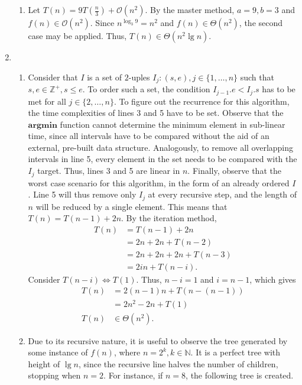 \documentclass[12pt]{article}
\begin{document}
\begin{enumerate}
\begin{enumerate}
    \item Let $T(n) = 9T(\frac{n}{3}) + \mathcal{O}(n^{2})$. By the master method, $a = 9, b = 3$ and $f(n) \in \mathcal{O}(n^{2})$. Since $n^{\log_{3} 9} = n^{2}$ and $f(n) \in \Theta(n^{2})$, the second case may be applied. Thus, $T(n) \in \Theta(n^{2} \lg n)$.
  \end{enumerate}
  \item
  \begin{enumerate}
    \item Consider that $I$ is a set of $2$-uples $I_{j} : (s, e), j \in \{1, \dots, n\}$ such that $s, e \in \mathbb{Z}^{+}, s \leq e$. To order such a set, the condition $I_{j - 1}.e < I_{j}.s$ has to be met for all $j \in \{2, \dots, n\}$. To figure out the recurrence for this algorithm, the time complexities of lines 3 and 5 have to be set. Observe that the $\textbf{argmin}$ function cannot determine the minimum element in sub-linear time, since all intervals have to be compared without the aid of an external, pre-built data structure. Analogously, to remove all overlapping intervals in line 5, every element in the set needs to be compared with the $I_{j}$ target. Thus, lines 3 and 5 are linear in $n$. Finally, observe that the worst case scenario for this algorithm, in the form of an already ordered $I$. Line 5 will thus remove only $I_{j}$ at every recursive step, and the length of $n$ will be reduced by a single element. This means that $T(n) = T(n - 1) + 2n$. By the iteration method,
    \begin{align*}
      T(n) &= T(n - 1) + 2n \\
      &= 2n + 2n + T(n - 2) \\
      &= 2n + 2n + 2n + T(n - 3) \\
      &= 2in + T(n - i).
    \end{align*}
    Consider $T(n - i) \Leftrightarrow T(1)$. Thus, $n - i = 1$ and $i = n - 1$, which gives
    \begin{align*}
      T(n) &= 2(n - 1)n + T(n - (n - 1)) \\
      &= 2n^{2} - 2n + T(1) \\
      T(n) &\in \Theta(n^{2}).
    \end{align*}
    \item Due to its recursive nature, it is useful to observe the tree generated by some instance of $f(n)$, where $n = 2^{k}, k \in \mathbb{N}$. It is a perfect tree with height of $\lg n$, since the recursive line halves the number of children, stopping when $n = 2$. For instance, if $n = 8$, the following tree is created.

\end{enumerate}
\end{enumerate}
\end{document}
